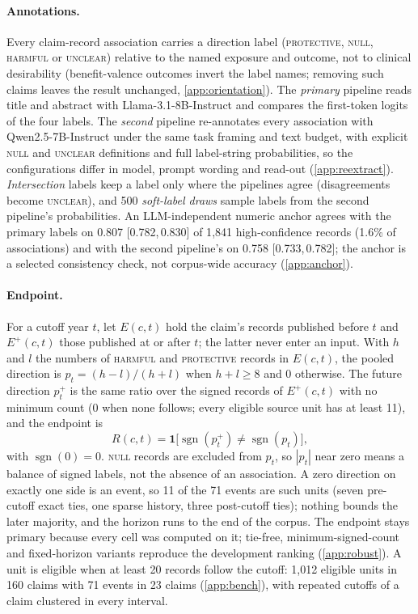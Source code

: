 \documentclass[11pt]{article}
\newcommand{\ci}[2]{[#1,\,#2]}
\newcommand{\sgn}{\operatorname{sgn}}
\begin{document}
\paragraph{Annotations.} Every claim-record association carries a direction label
(\textsc{protective}, \textsc{null}, \textsc{harmful} or \textsc{unclear}) relative to the named
exposure and outcome, not to clinical desirability (benefit-valence outcomes invert the label
names; removing such claims leaves the result unchanged, \cref{app:orientation}). The \emph{primary} pipeline reads title and
abstract with Llama-3.1-8B-Instruct \citep{llama3} and compares the first-token logits of the four
labels. The \emph{second} pipeline re-annotates every association with
Qwen2.5-7B-Instruct \citep{qwen25} under the same task framing and text budget, with explicit
\textsc{null} and \textsc{unclear} definitions and full label-string probabilities, so the
configurations differ in model, prompt wording and read-out (\cref{app:reextract}). \emph{Intersection} labels keep a label only where the pipelines agree (disagreements become \textsc{unclear}), and
500 \emph{soft-label draws} sample labels from the second pipeline's probabilities. An
LLM-independent numeric anchor agrees with the primary labels on 0.807 \ci{0.782}{0.830} of 1{,}841
high-confidence records (1.6\% of associations) and with the second pipeline's on 0.758
\ci{0.733}{0.782}; the anchor is a selected consistency check, not corpus-wide accuracy
(\cref{app:anchor}).

\paragraph{Endpoint.} For a cutoff year $t$, let $E(c,t)$ hold the claim's records published before
$t$ and $E^{+}(c,t)$ those published at or after $t$; the latter never enter an input. With $h$ and
$l$ the numbers of \textsc{harmful} and \textsc{protective} records in $E(c,t)$, the pooled
direction is $p_t=(h-l)/(h+l)$ when $h+l\ge8$ and 0 otherwise. The future direction $p^{+}_t$ is the
same ratio over the signed records of $E^{+}(c,t)$ with no minimum count (0 when none follows; every eligible source unit has at least 11), and the endpoint is
\begin{equation}
R(c,t)=\mathbf{1}\big[\sgn(p^{+}_t)\neq\sgn(p_t)\big],
\label{eq:target}
\end{equation}
with $\sgn(0)=0$. \textsc{null} records are excluded from $p_t$, so $|p_t|$ near zero means a
balance of signed labels, not the absence of an association. A zero direction on exactly one side
is an event, so 11 of the 71 events are such units (seven pre-cutoff exact ties, one sparse
history, three post-cutoff ties); nothing bounds the later majority, and the horizon runs to the
end of the corpus. The endpoint stays primary because every cell was computed on it; tie-free,
minimum-signed-count and fixed-horizon variants reproduce the development ranking
(\cref{app:robust}). A unit is eligible when at least 20 records follow the
cutoff: 1{,}012 eligible units in 160 claims with 71 events in 23 claims (\cref{app:bench}), with
repeated cutoffs of a claim clustered in every interval.
\end{document}
